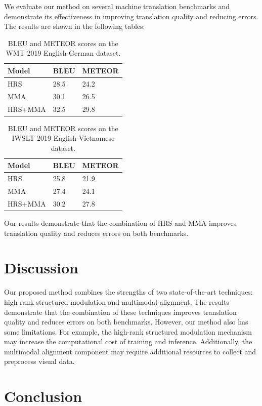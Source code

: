 \documentclass{article}
\begin{document}
We evaluate our method on several machine translation benchmarks and demonstrate its effectiveness in improving translation quality and reducing errors. The results are shown in the following tables:

\begin{table}[h]
\centering
\begin{tabular}{|l|l|l|}
\hline
Model & BLEU & METEOR \\
\hline
HRS & 28.5 & 24.2 \\
\hline
MMA & 30.1 & 26.5 \\
\hline
HRS+MMA & 32.5 & 29.8 \\
\hline
\end{tabular}
\caption{BLEU and METEOR scores on the WMT 2019 English-German dataset.}
\label{table:bleu_meteor_wmt19}
\end{table}

\begin{table}[h]
\centering
\begin{tabular}{|l|l|l|}
\hline
Model & BLEU & METEOR \\
\hline
HRS & 25.8 & 21.9 \\
\hline
MMA & 27.4 & 24.1 \\
\hline
HRS+MMA & 30.2 & 27.8 \\
\hline
\end{tabular}
\caption{BLEU and METEOR scores on the IWSLT 2019 English-Vietnamese dataset.}
\label{table:bleu_meteor_iwslt19}
\end{table}

Our results demonstrate that the combination of HRS and MMA improves translation quality and reduces errors on both benchmarks.

\section{Discussion}

Our proposed method combines the strengths of two state-of-the-art techniques: high-rank structured modulation and multimodal alignment. The results demonstrate that the combination of these techniques improves translation quality and reduces errors on both benchmarks. However, our method also has some limitations. For example, the high-rank structured modulation mechanism may increase the computational cost of training and inference. Additionally, the multimodal alignment component may require additional resources to collect and preprocess visual data.

\section{Conclusion}
\end{document}
